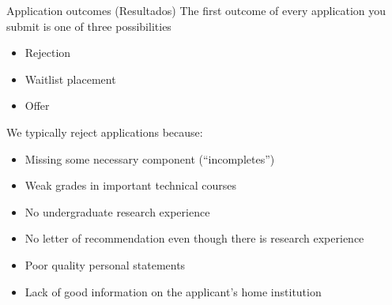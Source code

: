 \begin{frame}[fragile]{Application outcomes \textcolor{yellow!80!black}{(Resultados)}}
The first outcome of every application you submit is one of three possibilities
\begin{itemize}
    \item Rejection
    \item Waitlist placement
    \item Offer
\end{itemize}

We typically reject applications because:
\begin{itemize}
    \item Missing some necessary component (``incompletes'')
    \item Weak grades in important technical courses
    \item No undergraduate research experience
    \item No letter of recommendation even though there is research experience
    \item Poor quality personal statements
    \item Lack of good information on the applicant's home institution
\end{itemize}
\end{frame}

